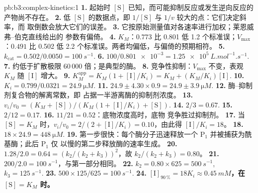 \begin{solution}{pb:b3:complex-kinetics:1}
\textbf{1.} 起始时 $[\mathrm S]$ 已知，而可能抑制反应或发生逆向反应的
产物尚不存在。
\textbf{2.} 低 $[\mathrm S]$ 的数据点，即 $1/[\mathrm S]$ 与 $1/v$ 较大的点：它们决定斜率，而
取倒数会放大它们的误差。
\textbf{3.} 它按原始测量值对各速率进行加权；莱恩威弗–伯克直线给出的
参数有偏倚。
\textbf{4.} $K_M$：$0.773$ 比 0.801 低 1.2 个标准误；$V_{\max}$：$0.491$ 比
0.502 低 2.2 个标准误。两者均偏低，与偏倚的预期相符。
\textbf{5.} $k_{\mathrm{cat}} = 0.502/0.0050 = \qty{100}{s^{-1}}$.
\textbf{6.} $100/\num{0.801e-3} = \qty{1.25e5}{L.mol^{-1}.s^{-1}}$.
\textbf{7.} 约低于扩散极限 60\,000 倍；是典型的酶。
\textbf{8.} 竞争性抑制：$V_{\max}$ 不变，表观 $K_M$ 随 $[\mathrm I]$ 增大。
\textbf{9.} $K_M^{\mathrm{app}} = K_M(1 + [\mathrm I]/K_i) = K_M + (K_M/K_i)[\mathrm I]$.
\textbf{10.} $K_i = 0.799/0.0321 = \qty{24.9}{\micro M}$.
\textbf{11.} $24.9 \pm 4.30 \times 0.9 = 24.9 \pm \qty{3.9}{\micro M}$.
\textbf{12.} 酶–抑制剂复合物的解离常数，即
占据一半游离酶的抑制剂浓度。
\textbf{13.} $v_i/v_0 = (K_M + [\mathrm S])/(K_M(1 + [\mathrm I]/K_i) + [\mathrm S])$.
\textbf{14.} $2/3 = 0.67$.
\textbf{15.} $2/12 = 0.17$.
\textbf{16.} $11/21 = 0.52$：底物浓度高时，底物
竞争胜过抑制剂。
\textbf{17.} 当 $[\mathrm S] = K_M$ 时，$v_i/v_0 = 2/(2 + [\mathrm I]/K_i) = 0.10$，由此得 $[\mathrm I]/K_i = 18$。
\textbf{18.} $18 \times 24.9 = \qty{448}{\micro M}$.
\textbf{19.} 第一步很快：每个酶分子迅速释放一个 $\mathrm P_1$
并被捕获为酰基酶；此后 $\mathrm P_1$ 仅
以慢的第二步释放酶的速率生成。
\textbf{20.} $1.28/2.0 = 0.64 = (k_2/(k_2 + k_3))^2$，故 $k_2/(k_2 + k_3) = 0.80$。
\textbf{21.} $200/2.0 = \qty{100}{s^{-1}}$，与第一部分相同。
\textbf{22.} $k_2 = 0.80 \times 625 = \qty{500}{s^{-1}}$, $k_3 = \qty{125}{s^{-1}}$.
\textbf{23.} $500 \times 125/625 = \qty{100}{s^{-1}}$.
\textbf{24.} \textbf{$[\mathrm I]_{90\,\%} = 18K_i \approx \qty{0.45}{mM}$，在 $[\mathrm S] = K_M$ 时。}
\end{solution}
